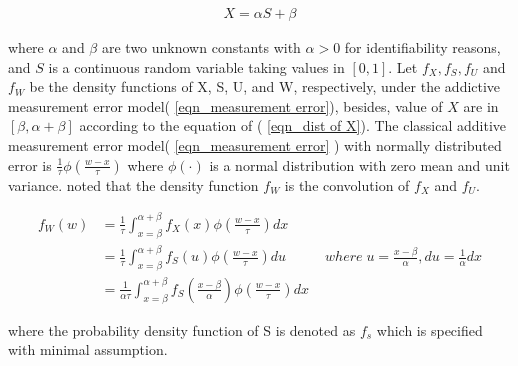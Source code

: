 \begin{gather} \label{eqn_dist of X}
X = \alpha S+\beta
\end{gather}

where $\alpha$ and $\beta$ are two unknown constants with $\alpha>0$ for identifiability reasons, and $S$ is a continuous random variable taking values in $[0,1]$. Let $f_X, f_S, f_U$ and $f_W$ be the density functions of X, S, U, and W, respectively, under the addictive measurement error model( \ref{eqn_measurement error}), besides, value of $X$ are in $[\beta, \alpha+\beta]$ according to the equation of ( \ref{eqn_dist of X}). The classical additive measurement error model( \ref{eqn_measurement error} ) with normally distributed error is $\displaystyle\frac{1}{\tau}\phi\left(\frac{w-x}{\tau}\right)$ where $\phi(\cdot)$ is  a normal distribution with zero mean and unit variance. \cite{carroll2006measurement} noted that the density function $f_W$ is the convolution of $f_X$ and $f_U$.


\begin{equation} \label{eqn_density of W}
\begin{split}
 f_W(w) & = \frac{1}{\tau}\int_{x=\beta}^{\alpha+\beta} f_X(x) \phi \displaystyle\left(\frac{w-x}{\tau}\right) dx \\
 			& = \frac{1}{\tau}\int_{x=\beta}^{\alpha+\beta} f_S (u)\phi\left(\frac{w-x}{\tau}\right) du  \;\;\;\;\; \;\;\;\;\;  where \; u = \frac{x-\beta}{\alpha},  du=\frac{1}{\alpha}dx\\
 			& = \frac{1}{\alpha\tau} \int_{x=\beta}^{\alpha+\beta} f_S\displaystyle\left(\frac{x-\beta}{\alpha}\right)\phi\left(\frac{w-x}{\tau}\right) dx
\end{split}
\end{equation}


where the probability density function of S is denoted as $f_s$  which is specified with minimal assumption.
